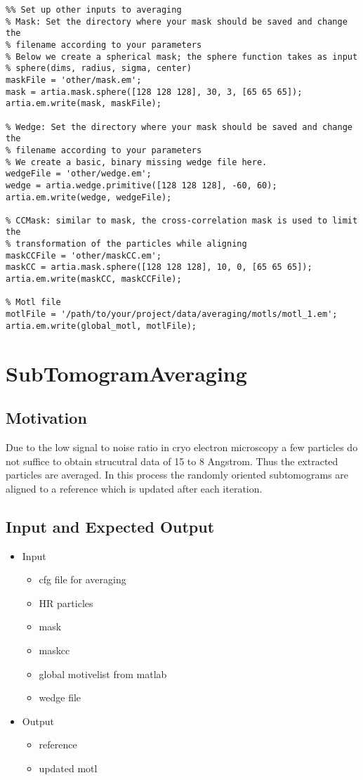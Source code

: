 \documentclass[12pt,a4paper]{scrartcl}
\begin{document}
{\begin{lstlisting}
%% Set up other inputs to averaging
% Mask: Set the directory where your mask should be saved and change the
% filename according to your parameters
% Below we create a spherical mask; the sphere function takes as input
% sphere(dims, radius, sigma, center)
maskFile = 'other/mask.em';
mask = artia.mask.sphere([128 128 128], 30, 3, [65 65 65]);
artia.em.write(mask, maskFile);

% Wedge: Set the directory where your mask should be saved and change the
% filename according to your parameters
% We create a basic, binary missing wedge file here.
wedgeFile = 'other/wedge.em';
wedge = artia.wedge.primitive([128 128 128], -60, 60);
artia.em.write(wedge, wedgeFile);

% CCMask: similar to mask, the cross-correlation mask is used to limit the 
% transformation of the particles while aligning
maskCCFile = 'other/maskCC.em';
maskCC = artia.mask.sphere([128 128 128], 10, 0, [65 65 65]);
artia.em.write(maskCC, maskCCFile);

% Motl file
motlFile = '/path/to/your/project/data/averaging/motls/motl_1.em';
artia.em.write(global_motl, motlFile);

\end{lstlisting}

\section{SubTomogramAveraging}
\subsection{Motivation}
Due to the low signal to noise ratio in cryo electron microscopy a few particles do not suffice to obtain strucutral data of 15 to 8 Angstrom. Thus the extracted particles are averaged. In this process the randomly oriented subtomograms are aligned to a reference which is updated after each iteration.  
 
\subsection{Input and Expected Output}
\begin{itemize}
\item Input
\begin{itemize}
\item cfg file for averaging
\item HR particles
\item mask
\item maskcc
\item global motivelist from matlab
\item wedge file  
\end{itemize}
\item Output
\begin{itemize}
\item reference
\item updated motl 
\end{itemize}
\end{itemize}
}
\end{document}
